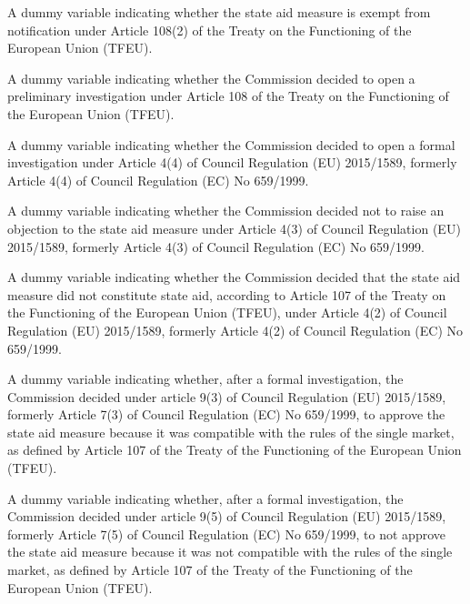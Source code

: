 \documentclass[10pt]{article}
\newcommand{\code}[1]{\codebox{{\footnotesize\texttt{#1}}}}
\begin{document}
\begin{flushleft}
\begin{description}[labelwidth=130pt, leftmargin=\dimexpr\labelwidth+\labelsep\relax, font=\normalfont, itemsep=10pt]
\item[\code{exempt}] \code{dummy}\hspace{5pt}A dummy variable indicating whether the state aid measure is exempt from notification under Article 108(2) of the Treaty on the Functioning of the European Union (TFEU).
\item[\code{preliminary\_investigation}] \code{dummy}\hspace{5pt}A dummy variable indicating whether the Commission decided to open a preliminary investigation under Article 108 of the Treaty on the Functioning of the European Union (TFEU).
\item[\code{formal\_investigation}] \code{dummy}\hspace{5pt}A dummy variable indicating whether the Commission decided to open a formal investigation under Article 4(4) of Council Regulation (EU) 2015/1589, formerly Article 4(4) of Council Regulation (EC) No 659/1999.
\item[\code{no\_objection}] \code{dummy}\hspace{5pt}A dummy variable indicating whether the Commission decided not to raise an objection to the state aid measure under Article 4(3) of Council Regulation (EU) 2015/1589, formerly Article 4(3) of Council Regulation (EC) No 659/1999. 
\item[\code{not\_aid}] \code{dummy}\hspace{5pt}A dummy variable indicating whether the Commission decided that the state aid measure did not constitute state aid, according to Article 107 of the Treaty on the Functioning of the European Union (TFEU), under Article 4(2) of Council Regulation (EU) 2015/1589, formerly Article 4(2) of Council Regulation (EC) No 659/1999. 
\item[\code{positive}] \code{dummy}\hspace{5pt}A dummy variable indicating whether, after a formal investigation, the Commission decided under article 9(3) of Council Regulation (EU) 2015/1589, formerly Article 7(3) of Council Regulation (EC) No 659/1999, to approve the state aid measure because it was compatible with the rules of the single market, as defined by Article 107 of the Treaty of the Functioning of the European Union (TFEU).
\item[\code{negative}] \code{dummy}\hspace{5pt}A dummy variable indicating whether, after a formal investigation, the Commission decided under article 9(5) of Council Regulation (EU) 2015/1589, formerly Article 7(5) of Council Regulation (EC) No 659/1999, to not approve the state aid measure because it was not compatible with the rules of the single market, as defined by Article 107 of the Treaty of the Functioning of the European Union (TFEU).

\end{description}
\end{flushleft}
\end{document}
